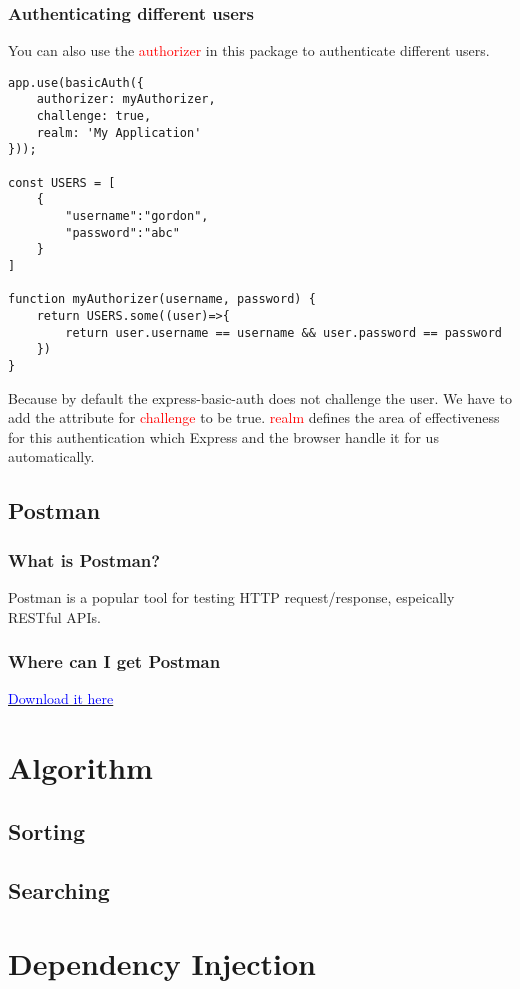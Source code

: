 \documentclass[a4paper]{article}
\begin{document}
\subsubsection{Authenticating different users}
You can also use the \textcolor{red}{authorizer} in this package to authenticate different users.
\begin{lstlisting}
app.use(basicAuth({
    authorizer: myAuthorizer,
    challenge: true,
    realm: 'My Application'
}));

const USERS = [
    {
        "username":"gordon",
        "password":"abc"
    }
]

function myAuthorizer(username, password) {
    return USERS.some((user)=>{
        return user.username == username && user.password == password
    })
}
\end{lstlisting}
Because by default the express-basic-auth does not challenge the user. We have to add the attribute for \textcolor{red}{challenge} to be true. \textcolor{red}{realm} defines the area of effectiveness for this authentication which Express and the browser handle it for us automatically.
\subsection{Postman}
\subsubsection{What is Postman?}
Postman is a popular tool for testing HTTP request/response, espeically RESTful APIs. 
\subsubsection{Where can I get Postman}
\href{https://www.getpostman.com/postman}{\textcolor{blue}{Download it here}}
\section{Algorithm}
\subsection{Sorting}
\subsection{Searching}

\section{Dependency Injection}
\end{document}
